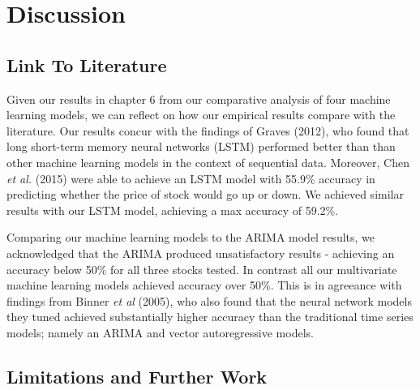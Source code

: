 
\chapter{Discussion} %

\label{Chapter7} %



\section{Link To Literature}

Given our results in chapter 6 from our comparative analysis of four machine learning models, we can reflect on how our empirical results compare with the literature. Our results concur with the findings of Graves (2012), who found that long short-term memory neural networks (LSTM) performed better than than other machine learning models in the context of sequential data. Moreover, Chen \textit{et al.} (2015) were able to achieve an LSTM model with 55.9\% accuracy in predicting whether the price of stock would go up or down. We achieved similar results with our LSTM model, achieving a max accuracy of 59.2\%. 

Comparing our machine learning models to the ARIMA model results, we acknowledged that the ARIMA produced unsatisfactory results - achieving an accuracy below 50\% for all three stocks tested. In contrast all our  multivariate machine learning models achieved accuracy over 50\%. This is in agreeance with findings from Binner \textit{et al} (2005), who also found that the neural network models they tuned achieved substantially higher accuracy than the traditional time series models; namely an ARIMA and vector autoregressive models.



\section{Limitations and Further Work}

